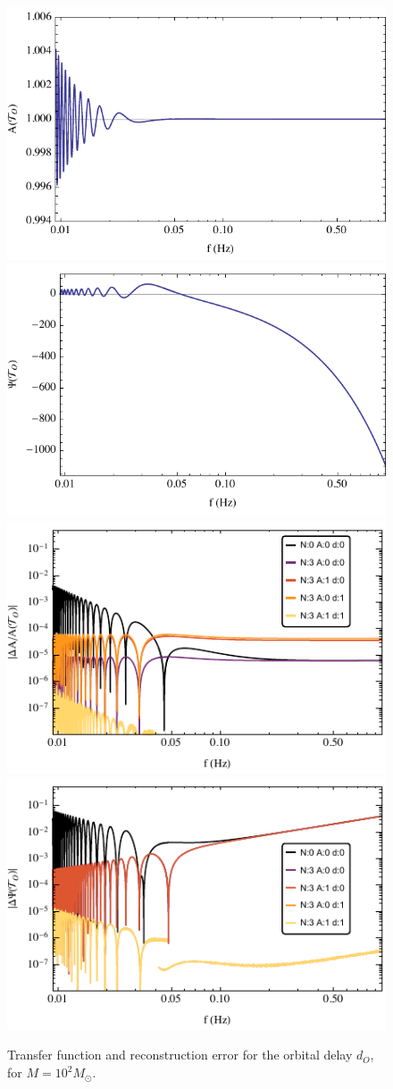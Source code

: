 \documentclass[aps,showpacs,%
prd,superscriptaddress,nofootinbib]{revtex4}
\newcommand{\Msol}{M_{\odot}}
\begin{document}
\begin{figure}
  \centering
  \includegraphics[width=.48\linewidth]{plots/LISAtransferM1e2dOamp.pdf}
  \hspace{0.2cm}
  \includegraphics[width=.48\linewidth]{plots/LISAtransferM1e2dOphase.pdf}
  \includegraphics[width=.48\linewidth]{plots/LISAerrorM1e2dOamp.pdf}
  \hspace{0.2cm}
  \includegraphics[width=.48\linewidth]{plots/LISAerrorM1e2dOphase.pdf}
  \caption{Transfer function and reconstruction error for the orbital delay $d_{O}$, for $M=10^{2} \Msol$.}
\end{figure}
\end{document}

